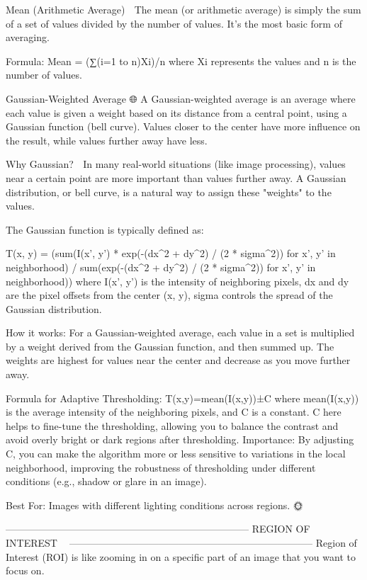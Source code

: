 Mean (Arithmetic Average) 🧮
The mean (or arithmetic average) is simply the sum of a set of values divided by the number of values. It's the most basic form of averaging.

Formula:
Mean = (∑(i=1 to n)Xi)/n
where Xi represents the values and n is the number of values.

Gaussian-Weighted Average 🌐
A Gaussian-weighted average is an average where each value is given a weight based on its distance from a central point, using a Gaussian function (bell curve). Values closer to the center have more influence on the result, while values further away have less.

Why Gaussian? 🧠
In many real-world situations (like image processing), values near a certain point are more important than values further away. A Gaussian distribution, or bell curve, is a natural way to assign these "weights" to the values.

The Gaussian function is typically defined as:

T(x, y) = (sum(I(x', y') * exp(-(dx^2 + dy^2) / (2 * sigma^2)) for x', y' in neighborhood) / sum(exp(-(dx^2 + dy^2) / (2 * sigma^2)) for x', y' in neighborhood))
where 
I(x', y') is the intensity of neighboring pixels,
dx and dy are the pixel offsets from the center (x, y),
sigma controls the spread of the Gaussian distribution.

How it works:
For a Gaussian-weighted average, each value in a set is multiplied by a weight derived from the Gaussian function, and then summed up. The weights are highest for values near the center and decrease as you move further away.

Formula for Adaptive Thresholding:
T(x,y)=mean(I(x,y))±C
where mean(I(x,y)) is the average intensity of the neighboring pixels, and C is a constant.
C here helps to fine-tune the thresholding, allowing you to balance the contrast and avoid overly bright or dark regions after thresholding.
Importance: By adjusting C, you can make the algorithm more or less sensitive to variations in the local neighborhood, improving the robustness of thresholding under different conditions (e.g., shadow or glare in an image).

Best For: Images with different lighting conditions across regions. 🌞

--------------------------------------------------------------------------
REGION OF INTEREST 📸👀
--------------------------------------------------------------------------
Region of Interest (ROI) is like zooming in on a specific part of an image that you want to focus on. 🌟

